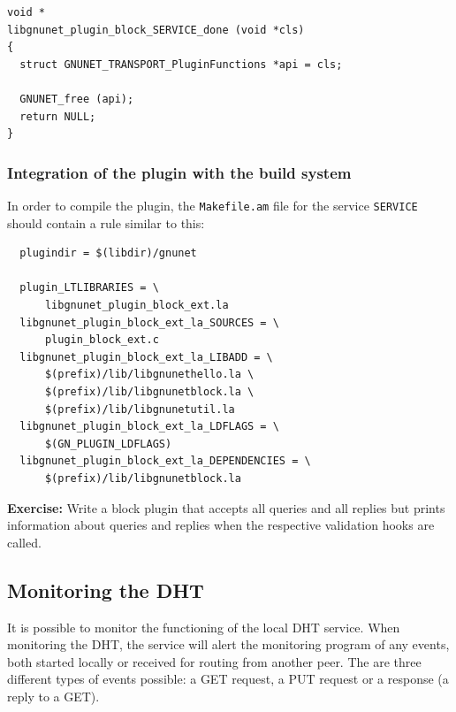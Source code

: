 \documentclass[10pt]{article}
\newcommand{\exercise}[1]{\noindent\begin{boxedminipage}{\textwidth}{\bf Exercise:} #1 \end{boxedminipage}}
\begin{document}
\lstset{language=C}
\begin{lstlisting}
void *
libgnunet_plugin_block_SERVICE_done (void *cls)
{
  struct GNUNET_TRANSPORT_PluginFunctions *api = cls;

  GNUNET_free (api);
  return NULL;
}
\end{lstlisting}


\subsubsection{Integration of the plugin with the build system}

In order to compile the plugin, the {\tt Makefile.am} file for the
service \texttt{SERVICE} should contain a rule similar to this:

\lstset{language=make}
\begin{lstlisting}
  plugindir = $(libdir)/gnunet

  plugin_LTLIBRARIES = \
	  libgnunet_plugin_block_ext.la
  libgnunet_plugin_block_ext_la_SOURCES = \
	  plugin_block_ext.c
  libgnunet_plugin_block_ext_la_LIBADD = \
	  $(prefix)/lib/libgnunethello.la \
	  $(prefix)/lib/libgnunetblock.la \
	  $(prefix)/lib/libgnunetutil.la
  libgnunet_plugin_block_ext_la_LDFLAGS = \
	  $(GN_PLUGIN_LDFLAGS)
  libgnunet_plugin_block_ext_la_DEPENDENCIES = \
	  $(prefix)/lib/libgnunetblock.la
\end{lstlisting}


\exercise{Write a block plugin that accepts all queries
and all replies but prints information about queries and replies
when the respective validation hooks are called.}



\subsection{Monitoring the DHT}
It is possible to monitor the functioning of the local DHT service. When monitoring
the DHT, the service will alert the monitoring program of any events,
both started locally or received for routing from another peer. The are three different
types of events possible: a GET request, a PUT request or a response (a reply to
a GET).
\end{document}
